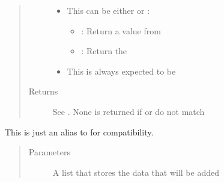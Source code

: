\documentclass[letterpaper,10pt,english]{sphinxmanual}
\begin{document}
\begin{fulllineitems}
\begin{fulllineitems}
\begin{quote}
\begin{description}
\begin{itemize}
\item {} 
 \textendash{} 
This can be either  or :
\begin{itemize}
\item {} 
: Return a value from 

\item {} 
: Return the 

\end{itemize}


\item {} 
 \textendash{} This is always expected to be 

\end{itemize}

\item[{Returns}] \leavevmode
See . None is returned if  or  do not match

\end{description}\end{quote}

\end{fulllineitems}


\begin{fulllineitems}
\label{\detokenize{src:src.PacketTableModel.PacketTableModel.insertRow}}
This is just an alias to {\hyperref[\detokenize{src:src.PacketTableModel.PacketTableModel.appendRow}]{}} for compatibility.
\begin{quote}\begin{description}
\item[{Parameters}] \leavevmode
{} \textendash{} A list that stores the data that will be added

\end{description}\end{quote}

\end{fulllineitems}



\end{fulllineitems}
\end{document}
